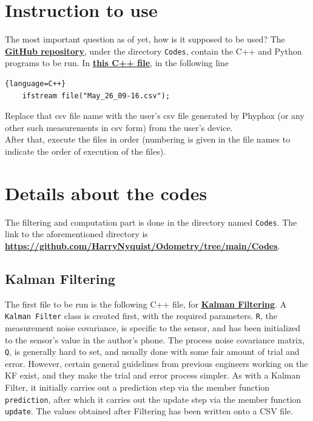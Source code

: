 \documentclass[oneside]{book}
\begin{document}
\chapter{Instruction to use}
The most important question as of yet, how is it supposed to be used? The \href{https://github.com/HarryNyquist/Odometry}{\underline{\textbf{GitHub repository}}}, under the directory \verb|Codes|, contain the C++ and Python programs to be run. In \href{https://github.com/HarryNyquist/Odometry/blob/main/Codes/1_KalmanFilter.cpp}{\underline{\textbf{this C++ file}}}, in the following line
\begin{lstlisting}{language=C++}
    ifstream file("May_26_09-16.csv");
\end{lstlisting}
Replace that csv file name with the user's csv file generated by Phyphox (or any other such measurements in csv form) from the user's device.\\
After that, execute the files in order (numbering is given in the file names to indicate the order of execution of the files). 

\chapter{Details about the codes}
The filtering and computation part is done in the directory named \verb|Codes|. The link to the aforementioned directory is \\ \href{https://github.com/HarryNyquist/Odometry/tree/main/Codes}{\underline{\textbf{https://github.com/HarryNyquist/Odometry/tree/main/Codes}}}.\\
\bigskip
\section{Kalman Filtering}
The first file to be run is the following C++ file, for \href{https://github.com/HarryNyquist/Odometry/blob/main/Codes/1_KalmanFilter.cpp}{\textbf{\underline{Kalman Filtering}}}. A \verb|Kalman Filter| class is created first, with the required parameters. \verb|R|, the measurement noise covariance, is specific to the sensor, and has been initialized to the sensor's value in the author's phone. The process noise covariance matrix, \verb|Q|, is generally hard to set, and usually done with some fair amount of trial and error. However, certain general guidelines from previous engineers working on the KF exist, and they make the trial and error process simpler. As with a Kalman Filter, it initially carries out a prediction step via the member function \verb|prediction|, after which it carries out the update step via the member function \verb|update|. The values obtained after Filtering has been written onto a CSV file.
\end{document}
